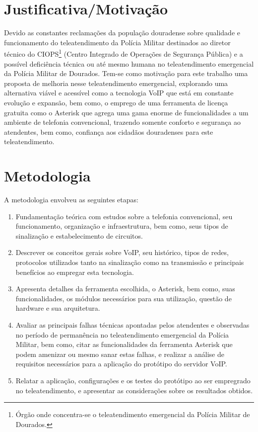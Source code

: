 \section{Justificativa/Motivação}
Devido as constantes reclamações da população douradense sobre qualidade e funcionamento do teleatendimento da Polícia Militar destinados ao diretor técnico do CIOPS\footnote{Órgão onde concentra-se o teleatendimento emergencial da Polícia Militar de Dourados.} (Centro Integrado de Operações de Segurança Pública) e a possível deficiência técnica ou até mesmo humana no teleatendimento emergencial da Polícia Militar de Dourados. Tem-se como motivação para este trabalho uma proposta de melhoria nesse teleatendimento emergencial, explorando uma alternativa viável e acessível como a tecnologia VoIP que está em constante evolução e expansão, bem como, o emprego de uma ferramenta de licença gratuita como o Asterisk que agrega uma gama enorme de funcionalidades a um ambiente de telefonia convencional, trazendo somente conforto e segurança ao atendentes, bem como, confiança aos cidadãos douradenses para este teleatendimento.

\section{Metodologia}
A metodologia envolveu as seguintes etapas:
\begin{enumerate}
  \item Fundamentação teórica com estudos sobre a telefonia convencional, seu funcionamento, organização e infraestrutura, bem como, seus tipos de sinalização e estabelecimento de circuitos.
  \item Descrever os conceitos gerais sobre VoIP, seu histórico, tipos de redes, protocolos utilizados tanto na sinalização como na transmissão e principais benefícios ao empregar esta tecnologia.
  \item Apresenta detalhes da ferramenta escolhida, o Asterisk, bem como, suas funcionalidades, os módulos necessários para sua utilização, questão de hardware e sua arquitetura.
  \item Avaliar as principais falhas técnicas apontadas pelos atendentes e observadas no período de permanência no teleatendimento emergencial da Polícia Militar, bem como, citar as funcionalidades da ferramenta Asterisk que podem amenizar ou mesmo sanar estas falhas, e realizar a análise de requisitos necessários para a aplicação do protótipo do servidor VoIP.
  \item Relatar a aplicação, configurações e os testes do protótipo ao ser empregrado no teleatendimento, e apresentar as considerações sobre os resultados obtidos.
\end{enumerate}

